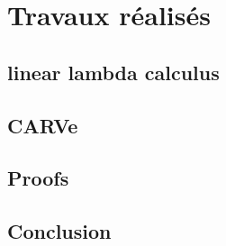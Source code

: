 %
\chapter{Travaux réalisés}
\label{sec::chapitre4}

\section{linear lambda calculus}

\section{CARVe}

\section{Proofs}

\section{Conclusion}